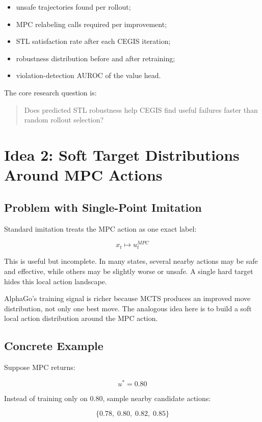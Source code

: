 \documentclass[11pt]{article}
\begin{document}
\begin{itemize}
  \item unsafe trajectories found per rollout;
  \item MPC relabeling calls required per improvement;
  \item STL satisfaction rate after each CEGIS iteration;
  \item robustness distribution before and after retraining;
  \item violation-detection AUROC of the value head.
\end{itemize}

The core research question is:

\begin{quote}
Does predicted STL robustness help CEGIS find useful failures faster than random rollout selection?
\end{quote}

\section{Idea 2: Soft Target Distributions Around MPC Actions}

\subsection{Problem with Single-Point Imitation}

Standard imitation treats the MPC action as one exact label:

\[
x_t \mapsto u_t^{MPC}
\]

This is useful but incomplete. In many states, several nearby actions may be safe and effective, while others may be slightly worse or unsafe. A single hard target hides this local action landscape.

AlphaGo's training signal is richer because MCTS produces an improved move distribution, not only one best move. The analogous idea here is to build a soft local action distribution around the MPC action.

\subsection{Concrete Example}

Suppose MPC returns:

\[
u^* = 0.80
\]

Instead of training only on \(0.80\), sample nearby candidate actions:

\[
\{0.78,\;0.80,\;0.82,\;0.85\}
\]
\end{document}
